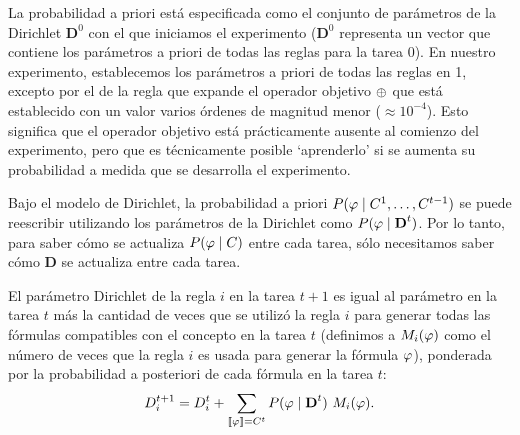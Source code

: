 La probabilidad a priori está especificada como el conjunto de parámetros de la Dirichlet $\textbf{D}^{0}$ con el que iniciamos el experimento ($\textbf{D}^{0}$ representa un vector que contiene los parámetros a priori de todas las reglas para la tarea 0). En nuestro experimento, establecemos los parámetros a priori de todas las reglas en 1, excepto por el de la regla que expande el operador objetivo $\oplus$ que está establecido con un valor varios órdenes de magnitud menor ($\approx 10^{-4}$). Esto significa que el operador objetivo está prácticamente ausente al comienzo del experimento, pero que es técnicamente posible `aprenderlo' si se aumenta su probabilidad a medida que se desarrolla el experimento.


Bajo el modelo de Dirichlet, la probabilidad a priori $P(\varphi\mid C^{1},\dots,C^{t-1})$ se puede reescribir utilizando los parámetros de la Dirichlet como $P(\varphi\mid\textbf{D}^{t})$. Por lo tanto, para saber cómo se actualiza $P(\varphi\mid C)$ entre cada tarea, sólo necesitamos saber cómo $\textbf{D}$ se actualiza entre cada tarea.


El parámetro Dirichlet de la regla $i$ en la tarea $t+1$ es igual al parámetro en la tarea $t$ más la cantidad de veces que se utilizó la regla $i$ para generar todas las fórmulas compatibles con el concepto en la tarea $t$ (definimos a $M_{i}(\varphi)$ como el número de veces que la regla $i$ es usada para generar la fórmula $\varphi$), ponderada por la probabilidad a posteriori de cada fórmula en la tarea $t$:
 \begin{equation}
 D_{i}^{t+1}=D_{i}^{t}+\sum_{\llbracket \varphi\rrbracket=C^t} P(\varphi\mid \textbf{D}^{t}) \ M_{i}(\varphi).
 \label{Dirichlet}
 \end{equation}

